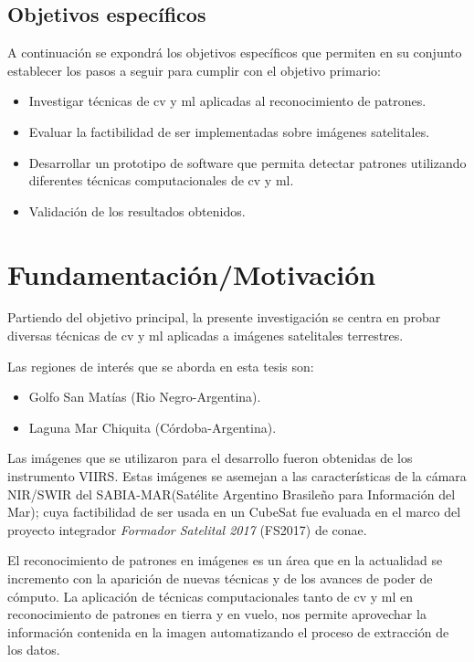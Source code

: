 \subsection{Objetivos específicos }\label{sub:ObjEspecif}
A continuación se expondrá los objetivos específicos que permiten en su conjunto establecer los pasos a seguir para  cumplir con el objetivo primario:
\begin{itemize}
 \item Investigar técnicas de \ac{cv} y \ac{ml} aplicadas al reconocimiento de patrones.
 \item Evaluar la factibilidad de ser implementadas sobre imágenes satelitales.
 \item Desarrollar un prototipo de software que permita detectar patrones utilizando diferentes técnicas computacionales de \ac{cv} y \ac{ml}.
 \item Validación de los resultados obtenidos.
\end{itemize}


\section{Fundamentación/Motivación}\label{sec:fundamentacion}

Partiendo del objetivo principal, la presente investigación se centra en probar diversas técnicas de \ac{cv} y \ac{ml} aplicadas a imágenes satelitales terrestres.

Las regiones de interés que se aborda en esta tesis son:
\begin{itemize}
	\item Golfo San Matías (Rio Negro-Argentina).
	\item Laguna Mar Chiquita (Córdoba-Argentina).
\end{itemize}

Las imágenes que se utilizaron para el desarrollo fueron obtenidas de los instrumento  VIIRS. Estas imágenes se asemejan a las características de la cámara NIR/SWIR del SABIA-MAR(Satélite Argentino Brasileño para Información del Mar); cuya factibilidad de ser usada en un CubeSat fue evaluada en el marco del proyecto integrador \textit{Formador Satelital 2017} (FS2017) de \ac{conae}.

El reconocimiento de patrones en imágenes es un área que en la actualidad se incremento con la aparición de nuevas técnicas y de los avances de poder de cómputo. La aplicación de técnicas computacionales tanto de  \ac{cv} y \ac{ml} en reconocimiento de patrones  en tierra y en vuelo, nos permite aprovechar la información contenida en la imagen  automatizando el proceso de extracción de los datos.

